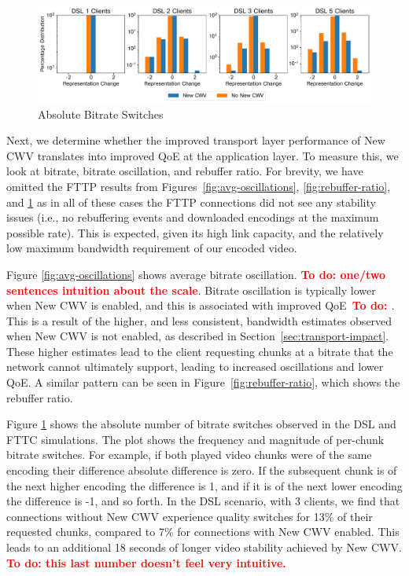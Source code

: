 \documentclass[10pt,sigconf,anonymous]{acmart}
\newcommand{\todo}[1]{\textbf{\textcolor{red}{To do: #1}}}
\begin{document}
\begin{figure}
  \centering
  \includegraphics[width=\textwidth, keepaspectratio]{figures/bitrate_derivative_distribution.pdf}
  \caption{Absolute Bitrate Switches}
  \label{fig:bitrate-switches}
\end{figure}

Next, we determine whether the improved transport layer performance of New CWV translates into improved QoE at the application layer. To measure this, we look at bitrate, bitrate oscillation, and rebuffer ratio. For brevity, we have omitted the FTTP results from Figures~\ref{fig:avg-oscillations}, \ref{fig:rebuffer-ratio}, and \ref{fig:bitrate-switches} as in all of these cases the FTTP connections did not see any stability issues (i.e., no rebuffering events and downloaded encodings at the maximum possible rate). This is expected, given its high link capacity, and the relatively low maximum bandwidth requirement of our encoded video.

Figure \ref{fig:avg-oscillations} shows average bitrate oscillation. \todo{one/two sentences intuition about the scale}. Bitrate oscillation is typically lower when New CWV is enabled, and this is associated with improved QoE~\todo{\cite{..}}. This is a result of the higher, and less consistent, bandwidth estimates observed when New CWV is not enabled, as described in Section~\ref{sec:transport-impact}. These higher estimates lead to the client requesting chunks at a bitrate that the network cannot ultimately support, leading to increased oscillations and lower QoE. A similar pattern can be seen in Figure~\ref{fig:rebuffer-ratio}, which shows the rebuffer ratio.

Figure \ref{fig:bitrate-switches} shows the absolute number of bitrate switches observed in the DSL and FTTC simulations. The plot shows the frequency and magnitude of per-chunk bitrate switches. For example, if both played video chunks were of the same encoding their difference absolute difference is zero. If the subsequent chunk is of the next higher encoding the difference is 1, and if it is of the next lower encoding the difference is -1, and so forth. In the DSL scenario, with 3 clients, we find that connections without New CWV experience quality switches for 13\% of their requested chunks, compared to 7\% for connections with New CWV enabled. This leads to an additional 18 seconds of longer video stability achieved by New CWV. \todo{this last number doesn't feel very intuitive.}
\end{document}
